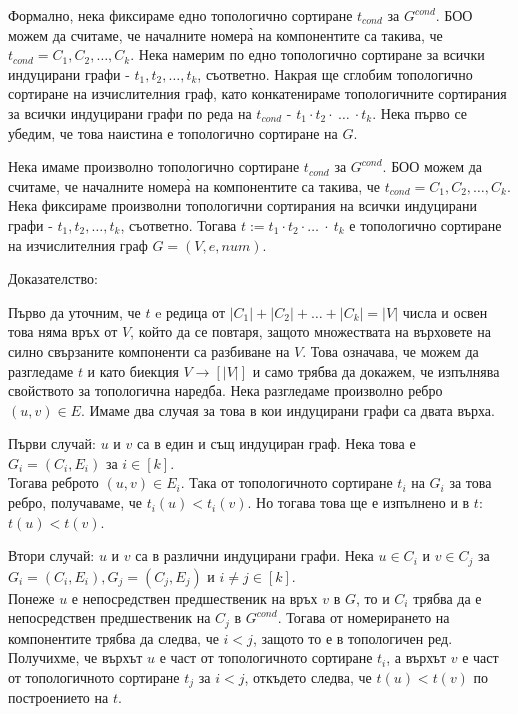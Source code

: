 \documentclass[12pt,twoside,a4paper]{article}
\begin{document}
	Формално, нека фиксираме едно топологично сортиране $t_{cond}$ за $G^{cond}$. БОО можем да считаме, че началните номера̀ на компонентите са такива, че $t_{cond} = C_1, C_2, \dots, C_k$. Нека намерим по едно топологично сортиране за всички индуцирани графи - $t_1, t_2, \dots, t_k$, съответно. Накрая ще сглобим топологично сортиране на изчислителния граф, като конкатенираме топологичните сортирания за всички индуцирани графи по реда на $t_{cond}$ - $t_1 \cdot t_2 \cdot \ \dots \ \cdot t_k$. Нека първо се убедим, че това наистина е топологично сортиране на $G$.
	
	\begin{statement} Нека имаме произволно топологично сортиране $t_{cond}$ за $G^{cond}$. БОО можем да считаме, че началните номера̀ на компонентите са такива, че $t_{cond} = C_1, C_2, \dots, C_k$. Нека фиксираме произволни топологични сортирания на всички индуцирани графи - $t_1, t_2, \dots, t_k$, съответно. Тогава $t := t_1 \cdot t_2 \cdot \dots \ \cdot \ t_k$ е топологично сортиране на изчислителния граф $G=(V,e,num)$.
		
		\noindent Доказателство:
		
		Първо да уточним, че $t$ e редица от $|C_1|+|C_2|+\dots+|C_k|=|V|$ числа и освен това няма връх от $V$, който да се повтаря, защото множествата на върховете на силно свързаните компоненти са разбиване на $V$. Това означава, че можем да разгледаме $t$ и като биекция $V \to [|V|]$ и само трябва да докажем, че изпълнява свойството за топологична наредба. Нека разгледаме произволно ребро $(u, v) \in E$. Имаме два случая за това в кои индуцирани графи са двата върха.
		
		Първи случай: $u$ и $v$ са в един и същ индуциран граф. Нека това е $G_i=(C_i,E_i)$ за $i \in [k]$.\\
		Тогава реброто $(u,v) \in E_i$. Така от топологичното сортиране $t_i$ на $G_i$ за това ребро, получаваме, че $t_i(u) < t_i(v)$. Но тогава това ще е изпълнено и в $t$: $t(u) < t(v)$.
		
		Втори случай: $u$ и $v$ са в различни индуцирани графи. Нека $u \in C_i$ и $v \in C_j$ за $G_i=(C_i,E_i), G_j=(C_j,E_j)$ и $i \neq j \in [k]$.\\
		Понеже $u$ е непосредствен предшественик на връх $v$ в $G$, то и $C_i$ трябва да е непосредствен предшественик на $C_j$ в $G^{cond}$. Тогава от номерирането на компонентите трябва да следва, че $i < j$, защото то е в топологичен ред. Получихме, че върхът $u$ е част от топологичното сортиране $t_i$, а върхът $v$ е част от топологичното сортиране $t_j$ за $i < j$, откъдето следва, че $t(u) < t(v)$ по построението на $t$.
	\end{statement}
	
\end{document}
